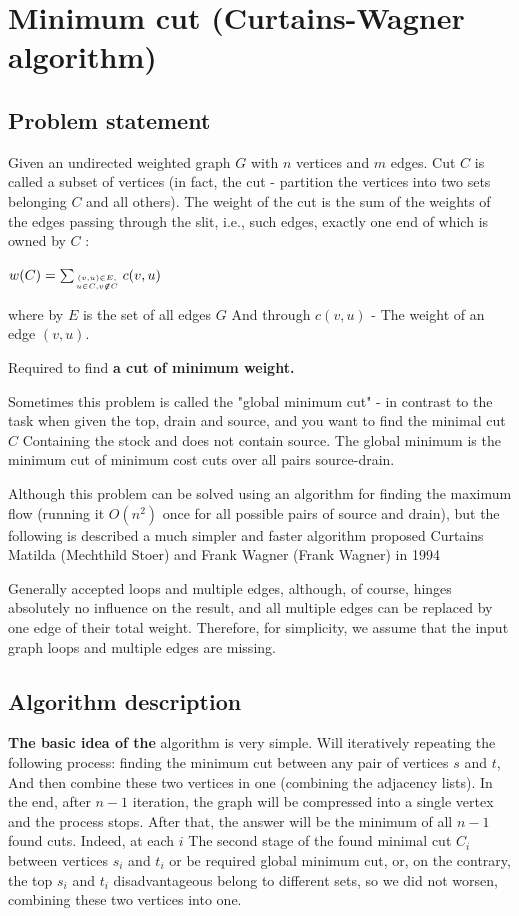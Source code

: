 \section{ Minimum cut (Curtains-Wagner algorithm) }
\subsection{ Problem statement }

Given an undirected weighted graph $G$ with $n$ vertices and $m$ edges. Cut $C$ is called a subset of vertices (in fact, the cut - partition the vertices into two sets belonging $C$ and all others). The weight of the cut is the sum of the weights of the edges passing through the slit, i.e., such edges, exactly one end of which is owned by $C$ :

$w(C)=\sum_{{(v,u)\in E,\atop u\in C,v\not\notin C}}c(v,u)$

where by $E$ is the set of all edges $G$ And through $c (v, u)$ - The weight of an edge $(v, u)$.

Required to find \textbf{a cut of minimum weight.}

Sometimes this problem is called the "global minimum cut" - in contrast to the task when given the top, drain and source, and you want to find the minimal cut $C$ Containing the stock and does not contain source. The global minimum is the minimum cut of minimum cost cuts over all pairs source-drain.

Although this problem can be solved using an algorithm for finding the maximum flow (running it $O (n ^ 2)$ once for all possible pairs of source and drain), but the following is described a much simpler and faster algorithm proposed Curtains Matilda (Mechthild Stoer) and Frank Wagner (Frank Wagner) in 1994

Generally accepted loops and multiple edges, although, of course, hinges absolutely no influence on the result, and all multiple edges can be replaced by one edge of their total weight. Therefore, for simplicity, we assume that the input graph loops and multiple edges are missing.

\subsection{ Algorithm description }

\textbf{The basic idea of the} algorithm is very simple. Will iteratively repeating the following process: finding the minimum cut between any pair of vertices $s$ and $t$, And then combine these two vertices in one (combining the adjacency lists). In the end, after $n-1$ iteration, the graph will be compressed into a single vertex and the process stops. After that, the answer will be the minimum of all $n-1$ found cuts. Indeed, at each $i$ The second stage of the found minimal cut $C_i$ between vertices $s_i$ and $t_i$ or be required global minimum cut, or, on the contrary, the top $s_i$ and $t_i$ disadvantageous belong to different sets, so we did not worsen, combining these two vertices into one.

